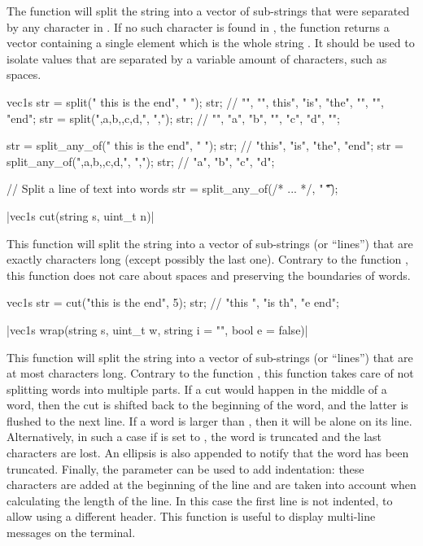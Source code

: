The  function will split the string  into a vector of sub-strings that were separated by any character in . If no such character is found in , the function returns a vector containing a single element which is the whole string . It should be used to isolate values that are separated by a variable amount of characters, such as spaces.

\begin{example}
\begin{cppcode}
vec1s str = split("  this is the   end", " ");
str; // {"", "", this", "is", "the", "", "", "end"};
str = split(",a,b,,c,d,", ",");
str; // {"", "a", "b", "", "c", "d", ""};

str = split_any_of("  this is the   end", " ");
str; // {"this", "is", "the", "end"};
str = split_any_of(",a,b,,c,d,", ",");
str; // {"a", "b", "c", "d"};

// Split a line of text into words
str = split_any_of(/* ... */, " \t\n\r");
\end{cppcode}
\end{example}

\funcitem \cppinline|vec1s cut(string s, uint_t n)| 

This function will split the string  into a vector of sub-strings (or ``lines'') that are exactly  characters long (except possibly the last one). Contrary to the function , this function does not care about spaces and preserving the boundaries of words.

\begin{example}
\begin{cppcode}
vec1s str = cut("this is the end", 5);
str; // {"this ", "is th", "e end"};
\end{cppcode}
\end{example}

\funcitem \cppinline|vec1s wrap(string s, uint_t w, string i = "", bool e = false)| 

This function will split the string  into a vector of sub-strings (or ``lines'') that are at most  characters long. Contrary to the function , this function takes care of not splitting words into multiple parts. If a cut would happen in the middle of a word, then the cut is shifted back to the beginning of the word, and the latter is flushed to the next line. If a word is larger than , then it will be alone on its line. Alternatively, in such a case if  is set to , the word is truncated and the last characters are lost. An ellipsis  is also appended to notify that the word has been truncated. Finally, the parameter  can be used to add indentation: these characters are added at the beginning of the line and are taken into account when calculating the length of the line. In this case the first line is not indented, to allow using a different header. This function is useful to display multi-line messages on the terminal.

